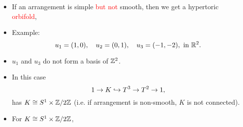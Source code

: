 \begin{frame}
    \begin{itemize}
        \item If an arrangement is simple \textcolor{red}{but not} smooth, then we get a hypertoric \textcolor{red}{orbifold},
        \item Example:
        \[
            u_{1} = (1,0),\quad u_{2} = (0,1), \quad u_{3} = (-1,-2), \text{ in } \mathbb{R}^{2}.
        \]
        \item $u_{1}$ and $u_{3}$ do not form a basis of $\mathbb{Z}^{2}$.
        \item In this case
        \[
            1 \rightarrow K \hookrightarrow T^{3} \rightarrow T^{2} \rightarrow 1,    
        \]
        has $K \cong S^{1} \times \mathbb{Z}/2\mathbb{Z}$ (i.e. if arrangement is non-smooth, $K$ is not connected).
    \end{itemize}
\end{frame}

\begin{frame}
    \begin{itemize}
        \item For $K \cong S^{1} \times \mathbb{Z}/2\mathbb{Z}$,
    \end{itemize}
\end{frame}